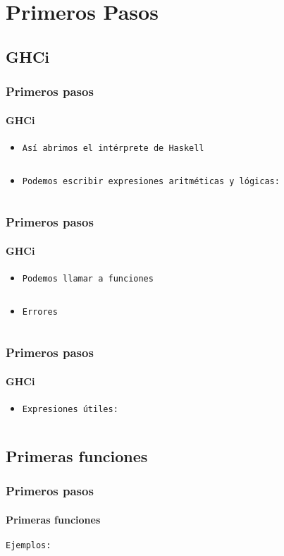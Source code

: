 \section{Primeros Pasos}
\subsection{GHCi}
\begin{frame}[fragile]
  \frametitle{Primeros pasos}
  \framesubtitle{GHCi}
  \begin{itemize}
  \item\texttt{Así abrimos el intérprete de Haskell}
    {\color{white}
      \inputminted[bgcolor=bg]{text}{code/primeros_pasos01.txt}
    }

  \item\texttt{Podemos escribir expresiones aritméticas y lógicas:}
    {\color{white}
      \inputminted[bgcolor=bg]{text}{code/primeros_pasos02.txt}
    }
  \end{itemize}
\end{frame}

\begin{frame}[fragile]
  \frametitle{Primeros pasos}
  \framesubtitle{GHCi}
  \begin{itemize}
  \item\texttt{Podemos llamar a funciones}
    {\color{white}
      \inputminted[bgcolor=bg]{text}{code/primeros_pasos03.txt}
    }

  \item\texttt{Errores}
    {\color{white}
        \inputminted[bgcolor=bg]{text}{code/primeros_pasos04.txt}
    }
  \end{itemize}
\end{frame}

\begin{frame}[fragile]
  \frametitle{Primeros pasos}
  \framesubtitle{GHCi}
  \begin{itemize}
  \item\texttt{Expresiones útiles:}
    {\color{white}
      \inputminted[bgcolor=bg]{text}{code/primeros_pasos05.txt}
    }
  \end{itemize}
\end{frame}

\subsection{Primeras funciones}
\begin{frame}[fragile]
  \frametitle{Primeros pasos}
  \framesubtitle{Primeras funciones}

  \texttt{Ejemplos:}
  {\color{white}
    \inputminted[bgcolor=bg]{haskell}{code/primeras_funciones01.hs}
  }
\end{frame}

